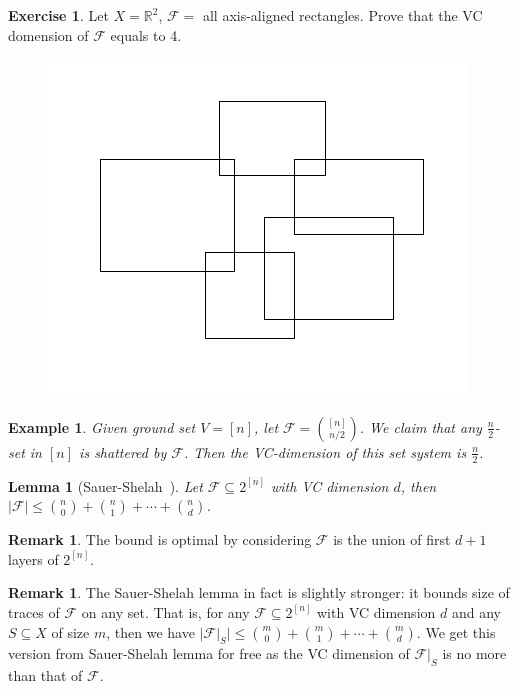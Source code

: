 \documentclass{article}
\newtheorem{lemma}[theorem]{Lemma}
\newtheorem{example}[theorem]{Example}
\theoremstyle{definition}
\newtheorem{remark}[theorem]{Remark}
\newtheorem{exercise}[theorem]{Exercise}
\begin{document}
 \begin{exercise}
    Let $X=\mathbb{R}^2$, $\mathcal{F}=$ all axis-aligned rectangles. Prove that the VC domension of $\mathcal{F}$ equals to 4.
    \begin{figure}[H]
        \centering
        \includegraphics[scale=0.5]{15-2.png}
    \end{figure}
\end{exercise}

\begin{example}
    Given ground set $V = [n]$, let $\mathcal{F} = \binom{[n]}{n/2}$. We claim that any $\frac{n}{2}$-set in $[n]$ is shattered by $\mathcal{F}$. Then the VC-dimension of this set system is $\frac{n}{2}$.
\end{example}


\begin{lemma} [Sauer-Shelah~\cite{sauer1972density,shelah1972combinatorial}]\label{F}
    Let $\mathcal{F}\subseteq 2^{[n]}$ with VC dimension $d$, then $|\mathcal{F}|\leq \binom{n}{0}+\binom{n}{1}+\cdots+\binom{n}{d}$.
\end{lemma}

\begin{remark}
The bound is optimal by considering $\mathcal{F}$ is the union of first $d+1$ layers of $2^{[n]}$.
\end{remark}

\begin{remark}
The Sauer-Shelah lemma in fact is slightly stronger: it bounds size of traces of $\mathcal{F}$ on any set. That is, for any $\mathcal{F}\subseteq 2^{[n]}$ with VC dimension $d$ and any $S\subseteq X$ of size $m$, then we have $|\mathcal{F}|_{S}|\leq \binom{m}{0}+\binom{m}{1}+\cdots+\binom{m}{d}$. We get this version from Sauer-Shelah lemma for free as the VC dimension of $\mathcal{F}|_{S}$ is no more than that of $\mathcal{F}$.
\end{remark}
\end{document}
